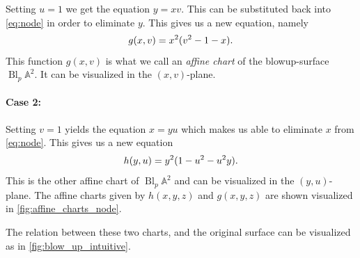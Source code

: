 \documentclass{article}
\newcommand{\A}{\ensuremath{\mathbb{A}}}
\DeclareMathOperator{\Bl}{Bl}
\begin{document}
\begin{example}
        Setting $u = 1$ we get the equation $y = xv$. This can be substituted
        back into \cref{eq:node} in order to eliminate $y$. This gives us a new
        equation, namely
        \begin{equation}
            \notag
            g(x, v) = x^2(v^2 - 1 - x).
        \end{equation}
        This function $g(x, v)$ is what we call an \emph{affine
        chart} of the blowup-surface $\Bl_p\A^2$. It can be
        visualized in the $(x, v)$-plane.

        \paragraph{Case 2:}
        \label{par:case_2}
        
        Setting $v = 1$ yields the equation $x = yu$ which makes us able to
        eliminate $x$ from \cref{eq:node}. This gives us a new equation
        \begin{equation}
            \notag
            h(y, u) = y^2(1 - u^2 - u^2y).
        \end{equation}
        This is the other affine chart of $\Bl_p\A^2$ and can be visualized in
        the $(y, u)$-plane.  The affine charts given by $h(x, y, z)$ and $g(x,
        y, z)$ are shown visualized in \cref{fig:affine_charts_node}.
        
        The relation between these two charts, and the original surface can be
        visualized as in \cref{fig:blow_up_intuitive}.


\end{example}
\end{document}
